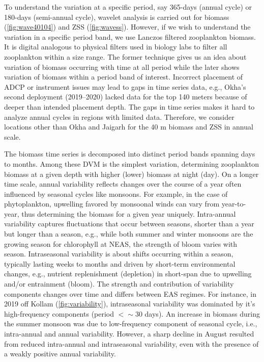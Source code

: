 \documentclass{article}
\begin{document}
	To understand the variation at a specific period, say 365-days (annual cycle) or 180-days (semi-annual cycle), wavelet analysis is carried out for biomass (\cref{fig:wave40104})  and ZSS (\cref{fig:wavess}). However, if we wish to understand the variation in a specific period band, we use Lanczos filtered zooplankton biomass. It is digital analogous to physical filters used in biology labs to filter all zooplankton within a size range. The former technique gives us an idea about variation of biomass occurring with time at all period while the later shows variation of biomass within a period band of interest. Incorrect placement of ADCP or instrument issues may lead to gaps in time series data, e.g., Okha's second deployment (2019--2020) lacked data for the top 140 meters because of deeper than intended placement depth. The gaps in time series makes it hard to analyze annual cycles in regions with limited data. Therefore, we consider locations other than Okha and Jaigarh for the 40 m biomass and ZSS in annual scale. 
		
	The biomass time series is decomposed into distinct period bands spanning days to months. Among these DVM is the simplest variation, determining zooplankton biomass at a given depth with higher (lower) biomass at night (day). On a longer time scale,  annual variability reflects changes over the course of a year often influenced by seasonal cycles like monsoons. For example, in the case of phytoplankton, upwelling favored by monsoonal winds can vary from year-to-year, thus determining the biomass for a given year uniquely. Intra-annual variability captures fluctuations that occur between seasons, shorter than a year but longer than a season, e.g., while both summer and winter monsoons are the growing season for chlorophyll at NEAS, the strength of bloom varies with season. Intraseasonal variability is about shifts occurring within a season, typically lasting weeks to months and driven by short-term environmental changes, e.g., nutrient  replenishment (depletion) in short-span due to upwelling and/or entrainment (bloom). The strength and contribution of variability components changes over time  and differs between EAS regimes. For instance, in 2019 off Kollam (\cref{fig:variability}), intraseasonal variability was dominated by it's high-frequency components (period $< \sim$30 days). An increase in biomass during the summer monsoon was due to low-frequency component of seasonal cycle, i.e., intra-annual and annual variability. However, a sharp decline in August resulted from reduced intra-annual and intraseasonal variability, even with the presence of a weakly positive annual variability. 
	
\end{document}
